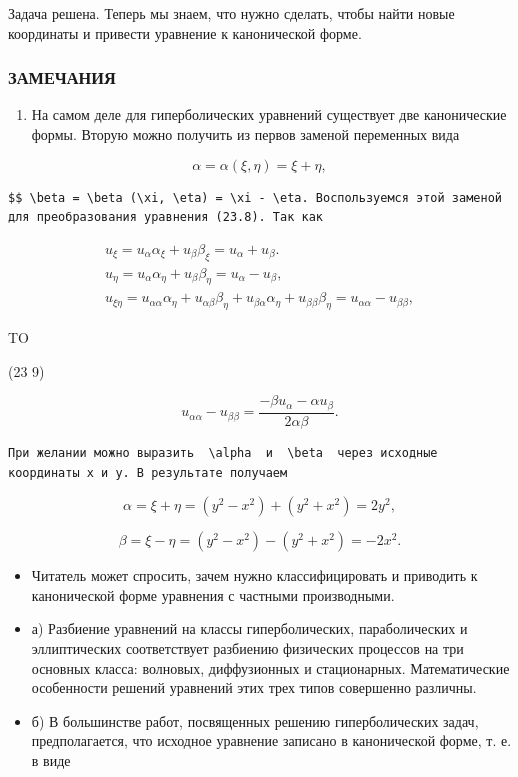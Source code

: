 \documentclass[
  ukrainian,
]{article}
\providecommand{\tightlist}{%
  \setlength{\itemsep}{0pt}\setlength{\parskip}{0pt}}
\begin{document}
Задача решена. Теперь мы знаем, что нужно сделать, чтобы найти новые
координаты и привести уравнение к канонической форме.

\subsubsection{ЗАМЕЧАНИЯ}\label{ux437ux430ux43cux435ux447ux430ux43dux438ux44f-4}

\begin{enumerate}
\def\labelenumi{\arabic{enumi}.}
\tightlist
\item
  На самом деле для гиперболических уравнений существует две
  канонические формы. Вторую можно получить из первов заменой переменных
  вида
\end{enumerate}

\[
\alpha = \alpha (\xi, \eta) = \xi + \eta,
\]

\begin{verbatim}
$$ \beta = \beta (\xi, \eta) = \xi - \eta. Воспользуемся этой заменой для преобразования уравнения (23.8). Так как
\end{verbatim}

\[
\begin{array}{l} u_{\xi} = u_{\alpha}\alpha_{\xi} + u_{\beta}\beta_{\xi} = u_{\alpha} + u_{\beta}. \\ u_{\eta} = u_{\alpha}\alpha_{\eta} + u_{\beta}\beta_{\eta} = u_{\alpha} - u_{\beta}, \\ u_{\xi\eta} = u_{\alpha\alpha}\alpha_{\eta} + u_{\alpha\beta}\beta_{\eta} + u_{\beta\alpha}\alpha_{\eta} + u_{\beta\beta}\beta_{\eta} = u_{\alpha\alpha} - u_{\beta\beta}, \end{array}
\]

TO

(23 9)

\[
u_{\alpha\alpha} - u_{\beta\beta} = \frac{-\beta u_{\alpha} - \alpha u_{\beta}}{2\alpha\beta}.
\]

\begin{verbatim}
При желании можно выразить  \alpha  и  \beta  через исходные координаты x и y. В результате получаем
\end{verbatim}

\[
\alpha = \xi + \eta = (y^2 - x^2) + (y^2 + x^2) = 2y^2,
\]

\[
\beta = \xi - \eta = (y^2 - x^2) - (y^2 + x^2) = -2x^2.
\]

\begin{itemize}
\item
  Читатель может спросить, зачем нужно классифицировать и приводить к
  канонической форме уравнения с частными производными.
\item
  а) Разбиение уравнений на классы гиперболических, параболических и
  эллиптических соответствует разбиению физических процессов на три
  основных класса: волновых, диффузионных и стационарных. Математические
  особенности решений уравнений этих трех типов совершенно различны.
\item
  б) В большинстве работ, посвященных решению гиперболических задач,
  предполагается, что исходное уравнение записано в канонической форме,
  т. е. в виде
\end{itemize}
\end{document}
